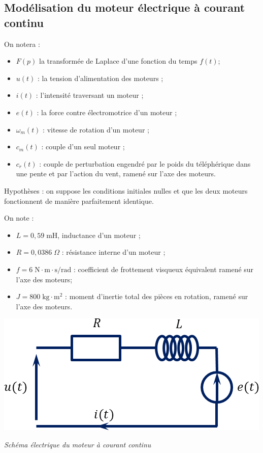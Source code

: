 \documentclass[10pt]{article}
\newif\ifprof
\begin{document}
\subsection{Modélisation du moteur électrique à courant continu}
\ifprof
\else
On notera :
\begin{itemize}
\item $F(p)$ la transformée de Laplace d’une fonction du temps $f(t)$;
\item $u(t)$ : la tension d’alimentation des moteurs ;
\item $i(t)$ : l’intensité traversant un moteur ;
\item $e(t)$ : la force contre électromotrice d’un moteur ;
\item $\omega_m (t)$ : vitesse de rotation d’un moteur ;
\item $c_m (t)$ : couple d’un seul moteur ;
\item $c_r (t)$ : couple de perturbation engendré par le poids du téléphérique dans une pente et par l’action du vent, ramené sur l’axe des moteurs.	 
\end{itemize}


Hypothèses : on suppose les conditions initiales nulles et que les deux moteurs fonctionnent de manière parfaitement identique. 


On note : 
\begin{minipage}[c]{.49\linewidth}
\begin{itemize}
\item $L=0,59 \; \text{mH}$, inductance d’un moteur ;
\item $R=0,0386 \; \Omega$ : résistance interne d'un moteur ;
\item $f=6 \; \text{N}\cdot \text{m}\cdot \text{s/rad}$ : coefficient de frottement visqueux équivalent ramené sur l’axe des moteurs;
\item $J=800 \; \text{kg}\cdot \text{m}^2$ : moment d’inertie total des pièces en rotation, ramené sur l’axe des moteurs.
\end{itemize}
\end{minipage}\hfill
\begin{minipage}[c]{.49\linewidth}
\begin{center}
\includegraphics[width=.8\textwidth]{images/SchemaElectrique}

\textit{Schéma électrique du moteur à courant continu}

\end{center}
\end{minipage}
\end{document}
